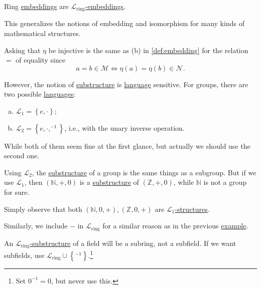 \begin{eg}
	Ring \hyperref[def:embedding]{embeddings} are \hyperref[def:embedding]{\(\mathcal{L} _{\text{ring} }\)-embeddings}.
\end{eg}

This generalizes the notions of embedding and isomorphism for many kinds of mathematical structures.

\begin{remark}
	Asking that \(\eta \) be injective is the same as (b) in \autoref{def:embedding} for the relation \(=\) of equality since
	\[
		a=b \in \mathcal{M} \iff \eta (a) = \eta (b) \in \mathcal{N} .
	\]
\end{remark}

However, the notion of \hyperref[def:substructure]{substructure} is \hyperref[def:language]{language} sensitive. For groups, there are two possible \hyperref[def:language]{languages}:
\begin{enumerate}[(a)]
	\item \(\mathcal{L} _1 = \left\{ e, \cdot \right\} \);
	\item \(\mathcal{L} _2 = \left\{ e, \cdot, ^{-1} \right\} \), i.e., with the unary inverse operation.
\end{enumerate}
While both of them seem fine at the first glance, but actually we should use the second one.

\begin{remark}
	Using \(\mathcal{L} _2\), the \hyperref[def:substructure]{substructure} of a group is the same things as a subgroup. But if we use \(\mathcal{L} _1\), then \((\mathbb{N}, +, 0)\) is a \hyperref[def:substructure]{substructure} of \((\mathbb{Z} , +, 0)\), while \(\mathbb{N} \) is not a group for sure.
\end{remark}
\begin{explanation}
	Simply observe that both \((\mathbb{N} , 0, +), (\mathbb{Z} , 0, +)\) are \hyperref[def:structure]{\(\mathcal{L} _1\)-structures}.
\end{explanation}

Similarly, we include \(-\) in \(\mathcal{L} _{\text{ring}}\) for a similar reason as in the previous \hyperref[eg:language-ring]{example}.

\begin{eg}
	An \hyperref[def:substructure]{\(\mathcal{L} _{\text{ring} }\)-substructure} of a field will be a subring, not a subfield. If we want subfields, use \(\mathcal{L} _{\text{ring} } \cup \left\{ ^{-1} \right\} \).\footnote{Set \(0^{-1} = 0\), but never use this.}
\end{eg}